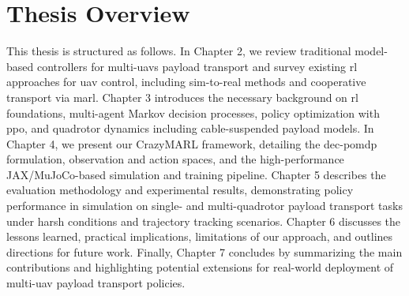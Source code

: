 \section{Thesis Overview}
This thesis is structured as follows. In Chapter 2, we review traditional model-based controllers for multi-\glspl{uav} payload transport and survey existing \gls{rl} approaches for \gls{uav} control, including sim-to-real methods and cooperative transport via \gls{marl}. Chapter 3 introduces the necessary background on \gls{rl} foundations, multi-agent Markov decision processes, policy optimization with \gls{ppo}, and quadrotor dynamics including cable-suspended payload models. In Chapter 4, we present our CrazyMARL framework, detailing the \gls{dec-pomdp} formulation, observation and action spaces, and the high-performance JAX/MuJoCo-based simulation and training pipeline. Chapter 5 describes the evaluation methodology and experimental results, demonstrating policy performance in simulation on single- and multi-quadrotor payload transport tasks under harsh conditions and trajectory tracking scenarios. Chapter 6 discusses the lessons learned, practical implications, limitations of our approach, and outlines directions for future work. Finally, Chapter 7 concludes by summarizing the main contributions and highlighting potential extensions for real-world deployment of multi-\gls{uav} payload transport policies.
